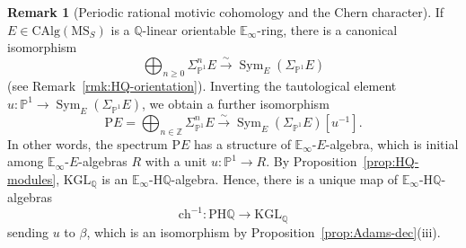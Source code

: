 \documentclass{amsart}
\numberwithin{equation}{section}
\theoremstyle{plain}
\theoremstyle{definition}
\newtheorem{remark}[equation]{Remark}
\let\bb=\mathbb
\let\rm=\mathrm
\def\Z{\bb Z}
\def\Q{\bb Q}
\def\P{\bb P}
\def\simto{\xrightarrow{\sim}}
\DeclareMathOperator{\Sym}{Sym}
\def\HH{\mathrm{H}}
\def\E{\mathbb{E}}
\def\KGL{\mathrm{KGL}}
\def\MS{\mathrm{MS}}
\def\CAlg{\mathrm{CAlg}{}}
\begin{document}
\begin{remark}[Periodic rational motivic cohomology and the Chern character]
	\label{rmk:chern}
	If $E\in\CAlg(\MS_S)$ is a $\Q$-linear orientable $\E_\infty$-ring, there is a canonical isomorphism
	\[
	\bigoplus_{n\geq 0} \Sigma_{\P^1}^n E \simto \Sym_E(\Sigma_{\P^1}E)
	\] 
	(see Remark~\ref{rmk:HQ-orientation}).
	Inverting the tautological element $u\colon \P^1\to \Sym_E(\Sigma_{\P^1}E)$, we obtain a further isomorphism
	\[
	\rm PE=\bigoplus_{n\in \Z} \Sigma_{\P^1}^n E \simto \Sym_E(\Sigma_{\P^1}E)[u^{-1}].
	\]
	In other words, the spectrum $\rm PE$ has a structure of $\E_\infty$-$E$-algebra, which is initial among $\E_\infty$-$E$-algebras $R$ with a unit $u\colon \P^1\to R$.
	By Proposition~\ref{prop:HQ-modules}, $\KGL_\Q$ is an $\E_\infty$-$\HH\Q$-algebra. Hence, there is a unique map of $\E_\infty$-$\HH\Q$-algebras
	\[
	\mathrm{ch}^{-1}\colon \rm P\HH\Q\to \KGL_\Q
	\]
	sending $u$ to $\beta$, which is an isomorphism by Proposition~\ref{prop:Adams-dec}(iii).
\end{remark}
\end{document}
